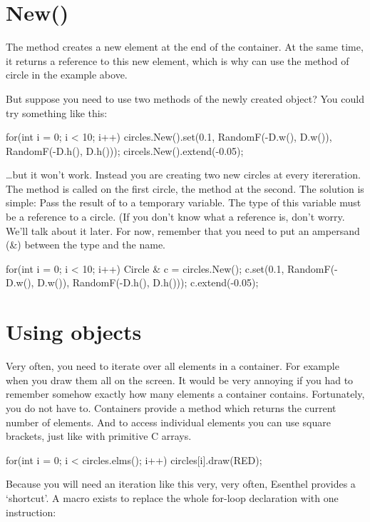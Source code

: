 \section{New()}
The method  creates a new element at the end of the container. At the same time, it returns a reference to this new element, which is why can use the  method of circle in the example above. 

But suppose you need to use two methods of the newly created object? You could try something like this:

\begin{code}
for(int i = 0; i < 10; i++)
{
	circles.New().set(0.1, RandomF(-D.w(), D.w()), RandomF(-D.h(), D.h()));
	circels.New().extend(-0.05);
}
\end{code}

\ldots but it won't work. Instead you are creating two new circles at every itereration. The method  is called on the first circle, the method  at the second. The solution is simple: Pass the result of  to a temporary variable. The type of this variable must be a reference to a circle. (If you don't know what a reference is, don't worry. We'll talk about it later. For now, remember that you need to put an ampersand (\&) between the type and the name.

\begin{code}
for(int i = 0; i < 10; i++)
{
	Circle & c = circles.New();
	c.set(0.1, RandomF(-D.w(), D.w()), RandomF(-D.h(), D.h()));
	c.extend(-0.05);
}
\end{code}

\section{Using objects}
Very often, you need to iterate over all elements in a container. For example when you draw them all on the screen. It would be very annoying if you had to remember somehow exactly how many elements a container contains. Fortunately, you do not have to. Containers provide a method  which returns the current number of elements. And to access individual elements you can use square brackets, just like with primitive C arrays.

\begin{code}
for(int i = 0; i < circles.elms(); i++)
{
  circles[i].draw(RED);
}
\end{code}

Because you will need an iteration like this very, very often, Esenthel provides a `shortcut'. A macro  exists to replace the whole for-loop declaration with one instruction:

